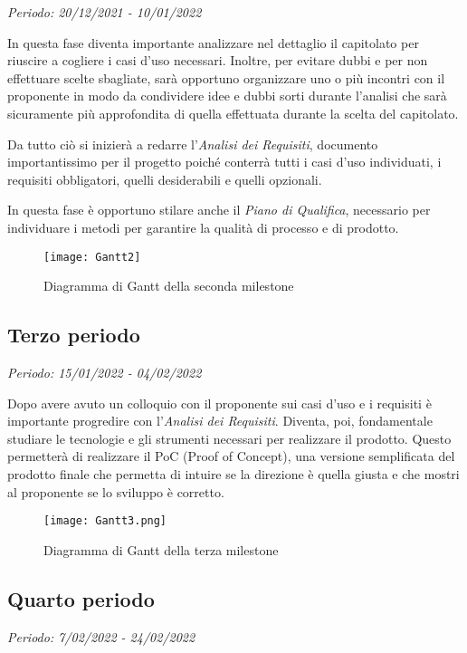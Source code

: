 \textit{Periodo: 20/12/2021 - 10/01/2022}

In questa fase diventa importante analizzare nel dettaglio il capitolato per riuscire a
cogliere i casi d'uso necessari. Inoltre, per evitare dubbi e per non effettuare
scelte sbagliate, sarà opportuno organizzare uno o più incontri con il proponente in modo da
condividere idee e dubbi sorti durante l'analisi che sarà sicuramente più approfondita di quella
effettuata durante la scelta del capitolato.
\par Da tutto ciò si inizierà a redarre l'\textit{Analisi dei Requisiti}, documento importantissimo per il progetto poiché
conterrà tutti i casi d'uso individuati, i requisiti obbligatori, quelli desiderabili e quelli opzionali.
\par In questa fase è opportuno stilare anche il \textit{Piano di Qualifica}, necessario per individuare
i metodi per garantire la qualità di processo e di prodotto.

\begin{figure}[!ht]
    \texttt{[image: Gantt2]}
    \caption{Diagramma di Gantt della seconda milestone} 
\end{figure}

\subsection{Terzo periodo}

\textit{Periodo: 15/01/2022 - 04/02/2022}

Dopo avere avuto un colloquio con il proponente sui casi d'uso e i requisiti è importante progredire con
l'\textit{Analisi dei Requisiti}. Diventa, poi, fondamentale studiare le tecnologie e gli strumenti necessari
per realizzare il prodotto. Questo permetterà di realizzare il PoC (Proof of Concept), una versione semplificata 
del prodotto finale che permetta di intuire se la direzione è quella giusta e che mostri al proponente se lo 
sviluppo è corretto.

\begin{figure}[!ht]
    \texttt{[image: Gantt3.png]}
    \caption{Diagramma di Gantt della terza milestone} 
\end{figure}


\subsection{Quarto periodo}
\textit{Periodo: 7/02/2022 - 24/02/2022}

